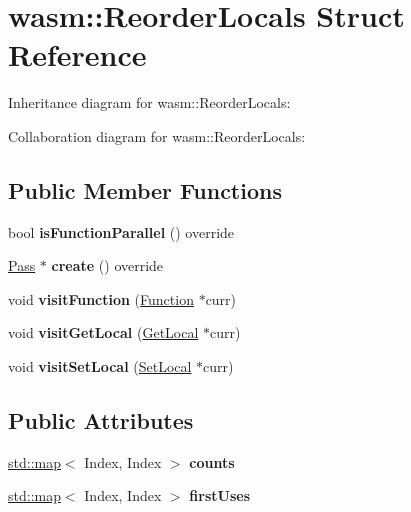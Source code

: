 \hypertarget{structwasm_1_1_reorder_locals}{}\section{wasm\+:\+:Reorder\+Locals Struct Reference}
\label{structwasm_1_1_reorder_locals}


Inheritance diagram for wasm\+:\+:Reorder\+Locals\+:


Collaboration diagram for wasm\+:\+:Reorder\+Locals\+:
\subsection*{Public Member Functions}
\begin{DoxyCompactItemize}
\item 
\mbox{\label{structwasm_1_1_reorder_locals_a2f4211973e8e5a15eb7d72fcf3790f91}} 
bool {\bfseries is\+Function\+Parallel} () override
\item 
\mbox{\label{structwasm_1_1_reorder_locals_ac1ae79ea9ad338132e0b7aefe82e4440}} 
\mbox{\hyperlink{classwasm_1_1_pass}{Pass}} $\ast$ {\bfseries create} () override
\item 
\mbox{\label{structwasm_1_1_reorder_locals_a22c37b6f61eef884f9658e0753c45941}} 
void {\bfseries visit\+Function} (\mbox{\hyperlink{classwasm_1_1_function}{Function}} $\ast$curr)
\item 
\mbox{\label{structwasm_1_1_reorder_locals_a9062664275a8e041ca269f3ab97c159d}} 
void {\bfseries visit\+Get\+Local} (\mbox{\hyperlink{classwasm_1_1_get_local}{Get\+Local}} $\ast$curr)
\item 
\mbox{\label{structwasm_1_1_reorder_locals_a9d71f167bb49c66ff3d1e1e155d889f3}} 
void {\bfseries visit\+Set\+Local} (\mbox{\hyperlink{classwasm_1_1_set_local}{Set\+Local}} $\ast$curr)
\end{DoxyCompactItemize}
\subsection*{Public Attributes}
\begin{DoxyCompactItemize}
\item 
\mbox{\label{structwasm_1_1_reorder_locals_a3bc49b67b2bbb6a0d2c374bab882af8c}} 
\mbox{\hyperlink{classstd_1_1map}{std\+::map}}$<$ Index, Index $>$ {\bfseries counts}
\item 
\mbox{\label{structwasm_1_1_reorder_locals_aba4d3cbc1d15960ff4f1dba039a7f7e2}} 
\mbox{\hyperlink{classstd_1_1map}{std\+::map}}$<$ Index, Index $>$ {\bfseries first\+Uses}
\end{DoxyCompactItemize}
